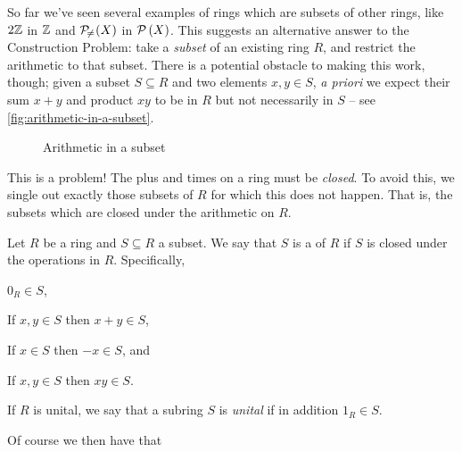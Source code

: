 So far we've seen several examples of rings which are subsets of other rings, like \(2\mathbb{Z}\) in \(\mathbb{Z}\) and \(\mathcal{P}_{\!\neq\!}\left(X\right)\) in \(\mathcal{P}\left(X\right)\).
This suggests an alternative answer to the Construction Problem: take a \emph{subset} of an existing ring \(R\), and restrict the arithmetic to that subset.
There is a potential obstacle to making this work, though; given a subset \(S \subseteq R\) and two elements \(x,y \in S\), \emph{a priori} we expect their sum \(x+y\) and product \(xy\) to be in \(R\) but not necessarily in \(S\) -- see \autoref{fig:arithmetic-in-a-subset}.
\begin{figure}[h!]
\begin{center}
\caption{Arithmetic in a subset \label{fig:arithmetic-in-a-subset}}
\end{center}
\end{figure}
This is a problem!
The plus and times on a ring must be \emph{closed}.
To avoid this, we single out exactly those subsets of \(R\) for which this does not happen.
That is, the subsets which are closed under the arithmetic on \(R\).

\begin{dfn}[Subring] \label{dfn:subring}
Let \(R\) be a ring and \(S \subseteq R\) a subset. We say that \(S\) is a  of \(R\) if \(S\) is closed under the operations in \(R\). Specifically,
\begin{proplist*}
\item \(0_R \in S\), \label{dfn:subring:zero}
\item If \(x,y \in S\) then \(x+y \in S\), \label{dfn:subring:plus}
\item If \(x \in S\) then \(-x \in S\), and \label{dfn:subring:neg}
\item If \(x,y \in S\) then \(xy \in S\). \label{dfn:subring:times}
\end{proplist*}
If \(R\) is unital, we say that a subring \(S\) is \emph{unital} if in addition \(1_R \in S\). 
\end{dfn}

Of course we then have that

